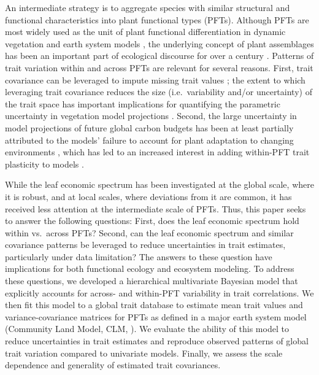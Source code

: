 \documentclass{article}
\begin{document}
An intermediate strategy is to aggregate species with similar structural and functional characteristics into plant functional types (PFTs).
Although PFTs are most widely used as the unit of plant functional differentiation in dynamic vegetation and earth system models
\citep{lavorel_1997_plant_functional_classifications,wullschleger_2014_plant,prentice_1992_special_paper},
the underlying concept of plant assemblages has been an important part of ecological discourse for over a century \citep{cowles_1899_ecological,clements_1936_nature,naeem_2003_disentangling}.
Patterns of trait variation within and across PFTs are relevant for several reasons.
First, trait covariance can be leveraged to impute missing trait values \citep{swenson_2013_phylogenetic};
the extent to which leveraging trait covariance reduces the size (i.e.\ variability and/or uncertainty) of the trait space has important implications for
quantifying the parametric uncertainty in vegetation model projections \citep{dietze_2013_improving,lebauer_2013_facilitating,dietze_2014_quantitative}.
Second, the large uncertainty in model projections of future global carbon budgets \citep{friedlingstein_2006_climate,friedlingstein_2014_uncertainties}
has been at least partially attributed to the models' failure to account for plant adaptation to changing environments \citep{sitch_2008_evaluation},
which has led to an increased interest in adding within-PFT trait plasticity to models \citep{van_2011_going,verheijen_2015_inclusion}.

While the leaf economic spectrum has been investigated at the global scale, where it is robust, and at local scales, where deviations from it are common, it has received less attention at the intermediate scale of PFTs.
Thus, this paper seeks to answer the following questions:
First, does the leaf economic spectrum hold within vs.\ across PFTs?
Second, can the leaf economic spectrum and similar covariance patterns be leveraged to reduce uncertainties in trait estimates, particularly under data limitation?
The answers to these question have implications for both functional ecology and ecosystem modeling.
To address these questions, we developed a hierarchical multivariate Bayesian model that explicitly accounts for across- and within-PFT variability in trait correlations.
We then fit this model to a global trait database to estimate mean trait values and variance-covariance matrices for PFTs as defined in a major earth system model (Community Land Model, CLM, \citealt{clm45_note}).
We evaluate the ability of this model to reduce uncertainties in trait estimates and reproduce observed patterns of global trait variation compared to univariate models.
Finally, we assess the scale dependence and generality of estimated trait covariances.
\end{document}
